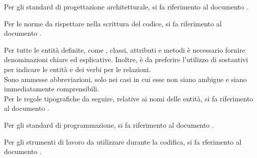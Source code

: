 	Per gli standard di progettazione architetturale, si fa riferimento al documento .

	Per le norme da rispettare nella scrittura del codice, si fa riferimento al documento .

	Per tutte le entità definite, come \textit{}, classi, attributi e metodi è necessario fornire denominazioni chiare ed esplicative. Inoltre, è da preferire l'utilizzo di sostantivi per indicare le entità e dei verbi per le relazioni.\\
	Sono ammesse abbreviazioni, solo nei casi in cui esse non siano ambigue e siano immediatamente comprensibili. \\
	Per le regole tipografiche da seguire, relative ai nomi delle entità, si fa riferimento al documento .

	Per gli standard di programmazione, si fa riferimento al documento .

	Per gli strumenti di lavoro da utilizzare durante la codifica, si fa rferimento al documento .
